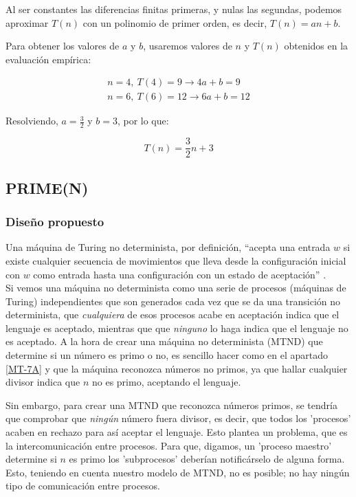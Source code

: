 Al ser constantes las diferencias finitas primeras, y nulas las segundas, podemos aproximar $T(n)$ con un polinomio de primer orden, es decir, $T(n) = an + b$.\medskip

Para obtener los valores de $a$ y $b$, usaremos valores de $n$ y $T(n)$ obtenidos en la evaluación empírica:

\begin{subequations}
    \begin{gather*}
        n = 4,\ T(4) = 9  \rightarrow 4a + b = 9 \\
        n = 6,\ T(6) = 12 \rightarrow 6a + b = 12
    \end{gather*}
\end{subequations}


Resolviendo, $a=\frac{3}{2}$ y $b=3$, por lo que:

\begin{equation}
    T(n) = \frac{3}{2}n + 3
\end{equation}



\subsection{PRIME(N)}

\subsubsection*{Diseño propuesto}
Una máquina de Turing no determinista, por definición, ``acepta una
entrada $w$ si existe cualquier secuencia de movimientos que lleva desde la configuración inicial con $w$ como entrada hasta una configuración con un estado de aceptación'' \parencite[ver][pg. 289]{HopcroftJohnE.2008Ialt}.\\
Si vemos una máquina no determinista como una serie de procesos (máquinas de Turing) independientes que son generados cada vez que se da una transición no determinista, que \textit{cualquiera} de esos procesos acabe en aceptación indica que el lenguaje es aceptado, mientras que que \textit{ninguno} lo haga indica que el lenguaje no es aceptado. A la hora de crear una máquina no determinista (MTND) que determine si un número es primo o no, es sencillo hacer como en el apartado \ref{MT-7A} y que la máquina reconozca números no primos, ya que hallar cualquier divisor indica que $n$ no es primo, aceptando el lenguaje.\medskip

Sin embargo, para crear una MTND que reconozca números primos, se tendría que comprobar que \textit{ningún} número fuera divisor, es decir, que todos los 'procesos' acaben en rechazo para así aceptar el lenguaje. Esto plantea un problema, que es la intercomunicación entre procesos. Para que, digamos, un 'proceso maestro' determine si $n$ es primo los 'subprocesos' deberían notificárselo de alguna forma.\\
Esto, teniendo en cuenta nuestro modelo de MTND, no es posible; no hay ningún tipo de comunicación entre procesos.\medskip


